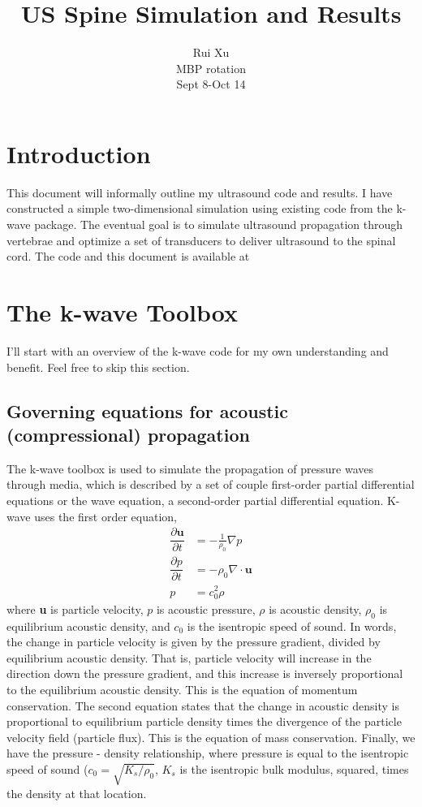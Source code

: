\documentclass[10pt,a4paper]{article}
\title{US Spine Simulation and Results}
\author{Rui Xu \\ MBP rotation\\ Sept 8-Oct 14}
\begin{document}
\maketitle
 \newpage

\section*{Introduction}

This document will informally outline my ultrasound code and results. I have constructed a simple two-dimensional simulation using existing code from the k-wave package. The eventual goal is to simulate ultrasound propagation through vertebrae and optimize a set of transducers to deliver ultrasound to the spinal cord. The code and this document is available at 

\section*{The k-wave Toolbox}

I'll start with an overview of the k-wave code for my own understanding and benefit. Feel free to skip this section. 

\subsection*{Governing equations for acoustic (compressional) propagation}

The k-wave toolbox is used to simulate the propagation of pressure waves through media, which is described by a set of couple first-order partial differential equations or the wave equation, a second-order partial differential equation. K-wave uses the first order equation, 
\begin{align}
\dfrac{\partial \textbf{u}}{\partial t} &= - \frac{1}{\rho_0} \nabla p\\
\dfrac{\partial p }{\partial t} &= - \rho_0 \nabla \cdot \textbf{u}\\
p &= c_0^2 \rho
\end{align}
where \textbf{u} is particle velocity, $p$ is acoustic pressure, $\rho$ is acoustic density, $\rho_0$ is equilibrium acoustic density, and $c_0$ is the isentropic speed of sound. In words, the change in particle velocity is given by the pressure gradient, divided by equilibrium acoustic density. That is, particle velocity will increase in the direction down the pressure gradient, and this increase is inversely proportional to the equilibrium acoustic density. This is the equation of momentum conservation. The second equation states that the change in acoustic density is proportional to equilibrium particle density times the divergence of the particle velocity field (particle flux). This is the equation of mass conservation. Finally, we have the pressure - density relationship, where pressure is equal to the isentropic speed of sound ($c_0 = \sqrt{K_s/\rho_0}$, $K_s$ is the isentropic bulk modulus, squared, times the density at that location. 
\end{document}
